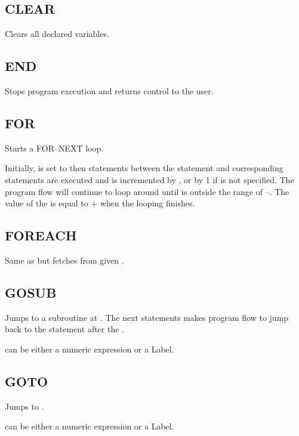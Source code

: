     \subsection{CLEAR}
        \par
        Clears all declared variables.
    \subsection{END}
        \par
        Stops program execution and returns control to the user.
    \subsection{FOR}
        \par
        Starts a FOR--NEXT loop.\par
        Initially,  is set to  then statements between the  statement and corresponding  statements are executed and  is incremented by , or by 1 if  is not specified. The program flow will continue to loop around until  is outside the range of --. The value of the  is equal to $+$ when the looping finishes.
    \subsection{FOREACH}
        \par
        Same as  but fetches  from given .
    \subsection{GOSUB}
        \par
        Jumps to a subroutine at . The next  statements makes program flow to jump back to the statement after the .\par
         can be either a numeric expression or a Label.
    \subsection{GOTO}
        \par
        Jumps to .\par
         can be either a numeric expression or a Label.
